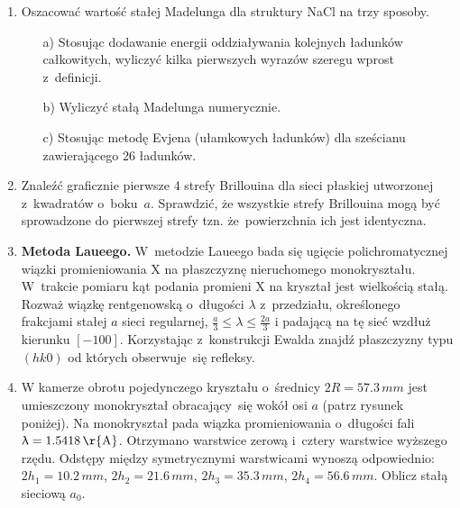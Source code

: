 \documentclass[a4paper,11pt]{article}
\begin{document}
\begin{enumerate}
\item Oszacować wartość stałej Madelunga dla struktury NaCl na trzy
  sposoby.

  \begin{itemize}
  \item[a)] Stosując dodawanie energii oddziaływania kolejnych
    ładunków całkowitych, wyliczyć kilka pierwszych wyrazów szeregu
    wprost z~definicji.

  \item[b)] Wyliczyć stałą Madelunga numerycznie.

  \item[c)] Stosując metodę Evjena (ułamkowych ładunków) dla sześcianu
    zawierającego 26 ładunków.

  \end{itemize}

\item Znaleźć graficznie pierwsze 4 strefy Brillouina dla sieci
  płaskiej utworzonej z~kwadratów o~boku~$a$. Sprawdzić, że wszystkie
  strefy Brillouina mogą być sprowadzone do pierwszej strefy tzn.
  że~powierzchnia ich jest identyczna.

\item \textbf{Metoda Laueego.} W~metodzie Laueego bada się ugięcie
  polichromatycznej wiązki promieniowania X na płaszczyznę
  nieruchomego monokryształu. W~trakcie pomiaru kąt podania promieni X
  na kryształ jest wielkością stałą. Rozważ wiązkę rentgenowską
  o~długości $\lambda$ z~przedziału, określonego frakcjami stałej $a$ sieci
  regularnej, $\frac{ a }{ 3 } \leq \lambda \leq \frac{ 2a }{ 3 }$ i padającą na
  tę sieć wzdłuż kierunku $[-100]$. Korzystając z~konstrukcji Ewalda
  znajdź płaszczyzny typu $(hk0)$ od których obserwuje~się refleksy.

\item W kamerze obrotu pojedynczego kryształu o~średnicy
  $2R = 57.3 \, \si{mm}$ jest umieszczony monokryształ obracający~się
  wokół osi $a$ (patrz rysunek poniżej). Na monokryształ pada wiązka
  promieniowania o~długości fali $\lambda = 1.5418 \, \si{\r{A}}$. Otrzymano
  warstwice zerową i~cztery warstwice wyższego rzędu. Odstępy między
  symetrycznymi warstwicami wynoszą odpowiednio:
  $2 h_{ 1 } = 10.2 \, \si{mm}$, $2 h_{ 2 } = 21.6 \, \si{mm}$,
  $2 h_{ 3 } = 35.3 \, \si{mm}$, $2 h_{ 4 } = 56.6 \, \si{mm}$. Oblicz
  stałą sieciową $a_{ 0 }$.




\end{enumerate}
\end{document}
